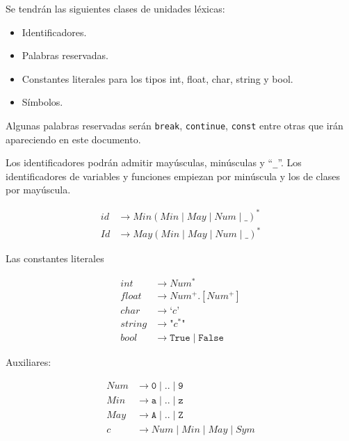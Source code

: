 \documentclass[10pt,a4paper]{article}
\newcommand{\cc}[1]{\texttt{#1}}
\newcommand{\ra}{\rightarrow}
\begin{document}
Se tendrán las siguientes clases de unidades léxicas:
\begin{itemize}
\item Identificadores.
\item Palabras reservadas.
\item Constantes literales para los tipos int, float, char, string y bool.
\item Símbolos. 
\end{itemize}

Algunas palabras reservadas serán \cc{break}, \cc{continue}, \cc{const} entre otras que irán apareciendo en este documento.

\newpage

Los identificadores podrán admitir mayúsculas, minúsculas y ``\cc{\_}''. Los identificadores de variables y funciones empiezan por minúscula y los de clases por mayúscula.

\begin{equation*} %
\begin{split}
id 	& \ra Min  (Min \mid May \mid Num\mid \cc{\_} )  ^{*} \\
Id	& \ra May  ( Min \mid May \mid Num \mid \cc{\_} )  ^*
\end{split}
\end{equation*}

Las constantes literales 

\begin{equation*}
\begin{split}
int 	& \ra Num^* \\
float 	& \ra Num^+.[Num^+] \\
char	& \ra \cc{`}c\cc{'} \\
string 	& \ra \cc{"{}} c^{*} \cc{"{}} \\
bool 	& \ra \cc{True}\mid \cc{False}
\end{split}
\end{equation*}


Auxiliares: 

\begin{equation*}
\begin{split}
Num	& \ra \cc{0}\mid ..\mid \cc{9} \\
Min	& \ra \cc{a}\mid ..\mid \cc{z}  \\
May	& \ra \cc{A}\mid ..\mid \cc{Z} \\
c 	& \ra Num\mid Min\mid May \mid Sym
\end{split}
\end{equation*}
\end{document}
